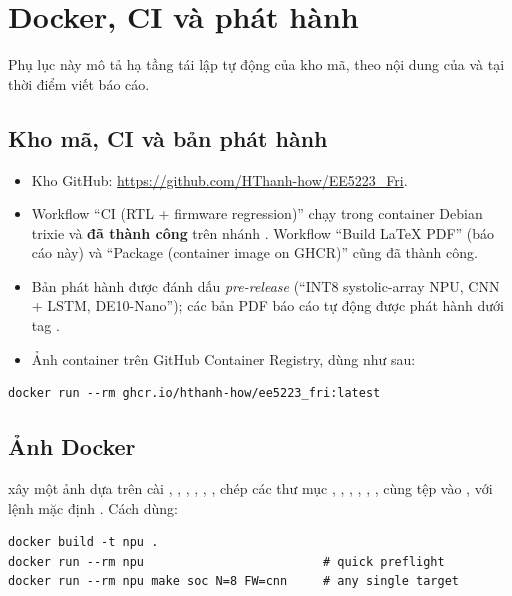 \chapter{Docker, CI và phát hành}
\label{app:docker}

Phụ lục này mô tả hạ tầng tái lập tự động của kho mã, theo nội dung của  và  tại thời điểm viết báo cáo.

\section{Kho mã, CI và bản phát hành}
\begin{itemize}
  \item Kho GitHub: \url{https://github.com/HThanh-how/EE5223_Fri}.
  \item Workflow ``CI (RTL + firmware regression)'' chạy  trong container Debian trixie và \textbf{đã thành công} trên nhánh . Workflow ``Build LaTeX PDF'' (báo cáo này) và ``Package (container image on GHCR)'' cũng đã thành công.
  \item Bản phát hành  được đánh dấu \emph{pre-release} (``INT8 systolic-array NPU, CNN + LSTM, DE10-Nano''); các bản PDF báo cáo tự động được phát hành dưới tag .
  \item Ảnh container trên GitHub Container Registry, dùng như sau:
\end{itemize}
\begin{lstlisting}[style=codebash]
docker run --rm ghcr.io/hthanh-how/ee5223_fri:latest
\end{lstlisting}

\section{Ảnh Docker}
 xây một ảnh dựa trên  cài , , , , , , chép các thư mục , , , , , ,  cùng tệp  vào , với lệnh mặc định . Cách dùng:
\begin{lstlisting}[style=codebash]
docker build -t npu .
docker run --rm npu                         # quick preflight
docker run --rm npu make soc N=8 FW=cnn     # any single target
\end{lstlisting}

